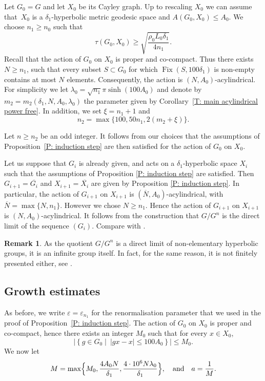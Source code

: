 \documentclass[JEP,XML,SOM,Unicode, NoEqCountersInSection,published]{cedram}
\theoremstyle{plain}
\theoremstyle{definition}
\newtheorem{rem}[thm]{Remark}
\DeclareMathOperator{\Fix}{Fix}
\newcommand{\q}[1]{\overline{#1}}
\begin{document}
Let $G_0=G$ and let $X_0$ be its Cayley graph.
Up to rescaling $X_0$ we can assume that~$X_0$ is a $\delta_1$-hyperbolic metric geodesic space and $A(G_0, X_0) \leq A_0$.
We choose $n_1 \geq n_0$ such that
\begin{equation*}
\tau(G_0, X_0) \geq \sqrt{\frac{\rho_0 L_0 \delta_1}{4n_1}}.
\end{equation*}
Recall that the action of $G_0$ on $X_0$ is proper and co-compact.
Thus there exists $N \geq n_1$, such that every subset $S \subset G_0$ for which $\Fix(S,100\delta_1)$ is non-empty contains at most $N$ elements.
Consequently, the action is $(N, A_0)$-acylindrical.
For simplicity we let $\lambda_0 = \sqrt{n_1} \pi \sinh\left( 100A_0\right)$ and denote by $m_2 = m_2(\delta_1, N, A_0, \lambda_0)$ the parameter given by Corollary~\ref{T: main acylindrical power free}.
In addition, we set $\xi = n_1 + 1$ and
\begin{equation*}
n_2 = \max\{ 100, 50n_1, 2(m_2 + \xi)\}.
\end{equation*}

Let $n \geq n_2$ be an odd integer.
It follows from our choices that the assumptions of Proposition~\ref{P: induction step} are then satisfied for the action of $G_0$ on $X_0$.

Let us suppose that $G_i$ is already given, and acts on a $\delta_1$-hyperbolic space $X_i$ such that the assumptions of Proposition \ref{P: induction step} are satisfied. Then $G_{i+1}=\q {G_{i}}$ and $X_{i+1}= \q {X_i}$ are given by Proposition \ref{P: induction step}.
In particular, the action of $G_{i+1}$ on $X_{i+1}$ is $(\q N, A_0)$-acylindrical, with $\q N = \max\{ N , n_1\}$.
However we chose $N \geq n_1$.
Hence the action of $G_{i+1}$ on $X_{i+1}$ is $(N,A_0)$-acylindrical.
It follows from the construction that $G/G^n$ is the direct limit of the sequence $(G_i)$. Compare with \cite[Th.\,7.7]{coulon_geometry_2014}.

\begin{rem} As the quotient $G/G^n$ is a direct limit of non-elementary hyperbolic groups, it is an infinite group itself. In fact, for the same reason, it is not finitely presented either, see \cite[Th.\,7.7]{coulon_geometry_2014}.
\end{rem}

\subsection{Growth estimates}
\label{sec: growth estimates}
As before, we write $\varepsilon = \varepsilon_{n_1}$ for the renormalisation parameter that we used in the proof of Proposition~\ref{P: induction step}.
The action of $G_0$ on $X_0$ is proper and co-compact, hence there exists an integer $M_0$ such that for every $x \in X_0$,
\begin{equation*}
\left| \left\{ g \in G_0 \mid \ |gx - x| \leq100 A_0\right\}\right| \leq M_0.
\end{equation*}
We now let
\begin{equation*}
M = \max \Bigl\{
M_0,
\frac{4A_0N}{\delta_1},
\frac{4\cdot 10^6 N \lambda_0}{\delta_1}
\Bigr\},
\quad \text{and} \quad
a = \frac 1M.
\end{equation*}
\end{document}
